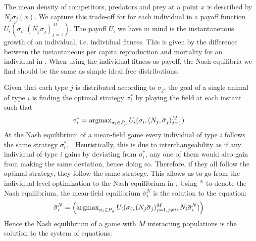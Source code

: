 The mean density of competitors, predators and prey at a point $x$ is described by $N_j \overbar{\sigma}_j(x)$. We capture this trade-off for for each individual in a payoff function $U_i(\sigma_i, (N_j \overbar{\sigma}_j)_{j=1}^M)$. The payoff $U_i$ we have in mind is the instantanenous growth of an individual, i.e. individual fitness. This is given by the difference between the instantaneous per capita reproduction and mortality for an individual in . When using the individual fitness as payoff, the Nash equilibria we find should be the same as simple ideal free distributions.

Given that each type $j$ is distributed according to $\overbar{\sigma}_j$, the goal of a single animal of type $i$ is finding the optimal strategy $\sigma_i^*$ by playing the field at each instant such that
\begin{equation}
  \label{eq:ind_opt}
  \sigma^*_i = \argmax_{\sigma_i \in P_{\mu}} U_i(\sigma_i, (N_j, \overbar{\sigma}_j)_{j=1}^M)
\end{equation}
At the Nash equilibrium of a mean-field game every individual of type $i$ follows the same strategy $\sigma_i^*$, \citep{lasry2007mean, aumann1964markets}. Heuristically, this is due to interchangeability as if any individual of type $i$ gains by deviating from $\sigma_i^*$, any one of them would also gain from making the same deviation, hence doing so. Therefore, if they all follow the optimal strategy, they follow the same strategy. This allows us to go from the individual-level optimization to the Nash equilibrium in . %
Using $^N$ to denote the Nash equilibrium, the mean-field equilibrium $\overbar{\sigma}_i^N$ is the solution to the equation:
\begin{equation}
  \label{eq:mfg_ne}
  \overbar{\sigma}_i^N = \pa{\argmax_{\sigma_i \in P_{\mu}} U_i(\sigma_i, (N_j \overbar{\sigma}_j)_{j=1, j\neq i}^M, N_i \overbar{\sigma}_i^N) }
\end{equation}
Hence the Nash equilibrium of a game with $M$ interacting populations is the solution to the system of equations:
